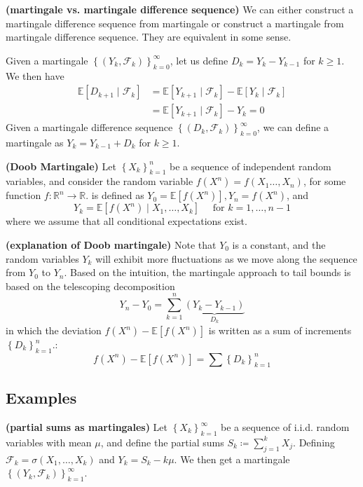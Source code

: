 \documentclass{article}
\newcommand{\bfs}[1]{\textbf{({#1})}}
\begin{document}
\begin{rema}{\bfs{martingale vs. martingale difference sequence}}
We can either construct a martingale difference sequence from martingale or  construct a martingale from martingale difference sequence. They are equivalent in some sense.

Given a martingale $\left\{\left(Y_{k}, \mathcal{F}_{k}\right)\right\}_{k=0}^{\infty}$, let us define $D_{k}=Y_{k}-Y_{k-1}$ for $k \geq 1$. We then have
$$
\begin{aligned}
\mathbb{E}\left[D_{k+1} \mid \mathcal{F}_{k}\right] &=\mathbb{E}\left[Y_{k+1} \mid \mathcal{F}_{k}\right]-\mathbb{E}\left[Y_{k} \mid \mathcal{F}_{k}\right] \\
&=\mathbb{E}\left[Y_{k+1} \mid \mathcal{F}_{k}\right]-Y_{k}=0
\end{aligned}
$$
Given a martingale difference sequence $\left\{\left(D_{k}, \mathcal{F}_{k}\right)\right\}_{k=0}^{\infty}$, we can define a martingale as $Y_{k}=Y_{k-1}+D_{k}$ for $k \geq 1$.
\end{rema}


\begin{defa}{\bfs{Doob Martingale}}
Let $\left\{X_{k}\right\}_{k=1}^{n}$ be a sequence of independent random variables, and consider the random variable $f(X^n)=f\left(X_{1} \ldots, X_{n}\right)$, for some function $f: \mathbb{R}^{n} \rightarrow \mathbb{R}$.  is defined as $Y_{0}=\mathbb{E}[f(X^n)], Y_{n}=f(X^n)$, and
$$
Y_{k}=\mathbb{E}\left[f(X^n) \mid X_{1}, \ldots, X_{k}\right] \quad \text { for } k=1, \ldots, n-1
$$
where we assume that all conditional expectations exist.
\end{defa}
\begin{rema}{\bfs{explanation of Doob martingale}}
Note that $Y_{0}$ is a constant, and the random variables $Y_{k}$ will exhibit more fluctuations as we move along the sequence from $Y_{0}$ to $Y_{n}$. Based on the intuition, the martingale approach to tail bounds is based on the telescoping decomposition
$$
Y_{n}-Y_{0}=\sum_{k=1}^{n} \underbrace{\left(Y_{k}-Y_{k-1}\right)}_{D_{k}}
$$
in which the deviation $f(X^n)-\mathbb{E}[f(X^n)]$ is written as a sum of increments $\left\{D_{k}\right\}_{k=1}^{n} .$:
$$
f(X^n)-\mathbb{E}[f(X^n)]=\sum \left\{D_{k}\right\}_{k=1}^{n}
$$
\end{rema}
\subsection{Examples}
\begin{exma}{\bfs{partial sums as martingales}}
Let $\left\{X_{k}\right\}_{k=1}^{\infty}$ be a sequence of i.i.d. random variables with mean $\mu$, and define the partial sums $S_{k}\coloneqq \sum_{j=1}^{k} X_{j} .$ Defining $\mathcal{F}_{k}=\sigma\left(X_{1}, \ldots, X_{k}\right)$ and $Y_k=S_k-k\mu$. We then get a martingale $\left\{\left(Y_{k}, \mathcal{F}_{k}\right)\right\}_{k=1}^{\infty}$.
\end{exma}
\end{document}
